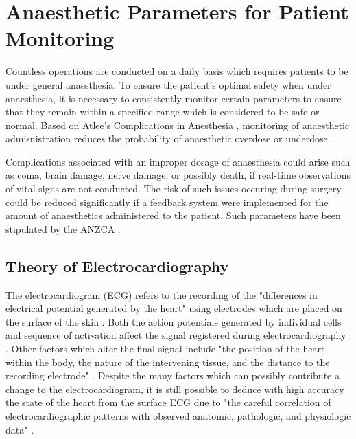 \section{Anaesthetic Parameters for Patient Monitoring}

Countless operations are conducted on a daily basis which requires patients to be under general anaesthesia. To ensure the patient's optimal safety when under anaesthesia, it is necessary to consistently monitor certain parameters to ensure that they remain within a specified range which is considered to be safe or normal. Based on Atlee's Complications in Anesthesia \cite{atlee2006complications}, monitoring of anaesthetic admisnistration reduces the probability of anaesthetic overdose or underdose. 

Complications associated with an improper dosage of anaesthesia could arise such as coma, brain damage, nerve damage, or possibly death, if real-time observations of vital signs are not conducted. The risk of such issues occuring during surgery could be reduced significantly if a feedback system were implemented for the amount of anaesthetics administered to the patient. Such parameters have been stipulated by the ANZCA \cite{anaesthesiaguide}. 

\subsection{Theory of Electrocardiography}

The electrocardiogram (ECG) refers to the recording of the "differences in electrical potential generated by the heart" using electrodes which are placed on the surface of the skin \cite{noble1990electrocardiography}. Both the action potentials generated by individual cells and sequence of activation affect the signal registered during electrocardiography \cite{noble1990electrocardiography}. Other factors which alter the final signal include "the position of the heart within the body, the nature of the intervening tissue, and the distance to the recording electrode" \cite{noble1990electrocardiography}. Despite the many factors which can possibly contribute a change to the electrocardiogram, it is still possible to deduce with high accuracy the state of the heart from the surface ECG due to "the careful correlation of electrocardiographic patterns with observed anatomic, pathologic, and physiologic data" \cite{noble1990electrocardiography}. 


